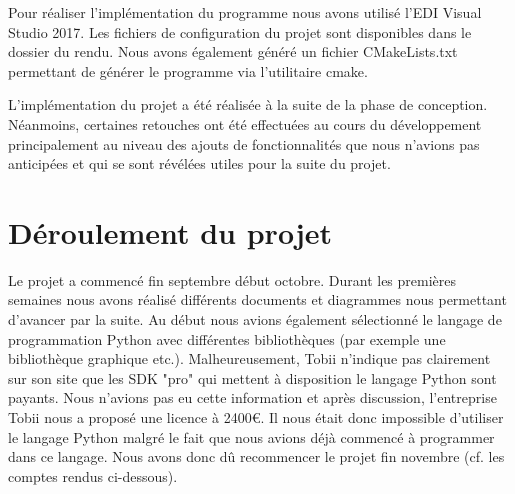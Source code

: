 \documentclass{polytech/polytech}
\begin{document}
Pour réaliser l'implémentation du programme nous avons utilisé l'EDI Visual Studio 2017. Les fichiers de configuration du projet sont disponibles dans le dossier du rendu. Nous avons également généré un fichier CMakeLists.txt permettant de générer le programme via l'utilitaire cmake. 

L'implémentation du projet a été réalisée à la suite de la phase de conception. Néanmoins, certaines retouches ont été effectuées au cours du développement principalement au niveau des ajouts de fonctionnalités que nous n'avions pas anticipées et qui se sont révélées utiles pour la suite du projet. 

\section{Déroulement du projet}
Le projet a commencé fin septembre début octobre. Durant les premières semaines nous avons réalisé différents documents et diagrammes nous permettant d'avancer par la suite. Au début nous avions également sélectionné le langage de programmation Python avec différentes bibliothèques (par exemple une bibliothèque graphique etc.). Malheureusement, Tobii n'indique pas clairement sur son site que les SDK "pro" qui mettent à disposition le langage Python sont payants. Nous n'avions pas eu cette information et après discussion, l'entreprise Tobii nous a proposé une licence à 2400€. Il nous était donc impossible d'utiliser le langage Python malgré le fait que nous avions déjà commencé à programmer dans ce langage. 
	Nous avons donc dû recommencer le projet fin novembre (cf. les comptes rendus ci-dessous). 
    
\end{document}
